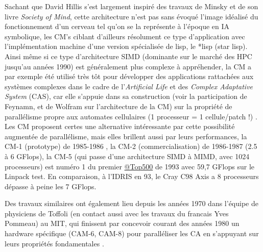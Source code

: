 Sachant que David Hillis s'est largement inspiré des travaux de Minsky et de son livre \textit{Society of Mind}, cette architecture n'est pas sans évoqué l'image idéalisé du fonctionnement d'un cerveau tel qu'on se la représente à l'époque en IA symbolique, les CM's ciblant d'ailleurs résolument ce type d'application avec l'implémentation machine d'une version spécialisée de lisp, le *lisp (star lisp). Ainsi même si ce type d’architecture SIMD (dominante sur le marché des HPC jusqu’au années 1990) est généralement plus complexe à appréhender, la CM a par exemple été utilisé très tôt pour développer des applications rattachées aux systèmes complexes dans le cadre de l’\textit{Artificial Life} et des \textit{Complex Adaptative System} (CAS), car elle s’appuie dans sa construction (voir la participation de Feynamn, et de Wolfram sur l'architecture de la CM) sur la propriété de parallélisme propre aux automates cellulaires (1 processeur = 1 cellule/patch !) . Les CM proposent certes une alternative intéressante par cette possibilité augmentée de parallélisme, mais elles brillent aussi par leurs performances, la CM-1 (prototype) de 1985-1986 , la CM-2 (commercialisation) de 1986-1987 (2.5 à 6 GFlops), la CM-5 (qui passe d'une architecture SIMD à MIMD, avec 1024 processeurs) est numéro 1 du premier \href{http://www.top500.org/featured/systems/cm-5-los-alamos-national-lab/}{@Top500} de 1993 avec 59,7 GFlops sur le Linpack test. En comparaison, à l'IDRIS en 93, le Cray C98 Axis a 8 processeurs dépasse à peine les 7 GFlops.

Des travaux similaires ont également lieu depuis les années 1970 dans l’équipe de physiciens de Toffoli (en contact aussi avec les travaux du francais Yves Pommeau) au MIT, qui finissent par concevoir courant des années 1980 un hardware spécifique (CAM-6, CAM-8) pour paralléliser les CA en s’appuyant sur leurs propriétés fondamentales .

